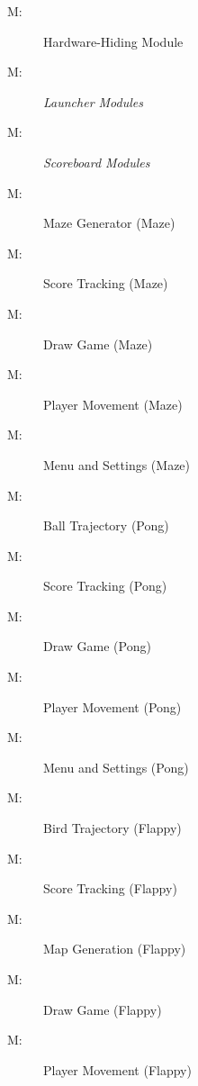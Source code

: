 \documentclass[12pt, titlepage]{article}
\newcounter{mnum}
\newcommand{\mthemnum}{M\themnum}
\begin{document}
\begin{description}
\item [ \mthemnum \label{mHH}:] Hardware-Hiding Module
\item [ \mthemnum \label{mLM}:] \textit{Launcher Modules}
\item [ \mthemnum \label{mSM}:] \textit{Scoreboard Modules}
\item [ \mthemnum \label{mMGM}:] Maze Generator (Maze)
\item [ \mthemnum \label{mSTM}:] Score Tracking (Maze)
\item [ \mthemnum \label{mDGM}:] Draw Game (Maze) 
\item [ \mthemnum \label{mPMM}:] Player Movement (Maze)
\item [ \mthemnum \label{mMSM}:] Menu and Settings (Maze) 
\item [ \mthemnum \label{mBTP}:] Ball Trajectory (Pong)
\item [ \mthemnum \label{mSTP}:] Score Tracking (Pong) 
\item [ \mthemnum \label{mDGP}:] Draw Game (Pong)
\item [ \mthemnum \label{mPMP}:] Player Movement (Pong)
\item [ \mthemnum \label{mMSP}:] Menu and Settings (Pong)
\item [ \mthemnum \label{mBDF}:] Bird Trajectory (Flappy)
\item [ \mthemnum \label{mSTF}:] Score Tracking (Flappy)
\item [ \mthemnum \label{mMGF}:] Map Generation (Flappy)
\item [ \mthemnum \label{mDGF}:] Draw Game (Flappy)
\item [ \mthemnum \label{mPMF}:] Player Movement (Flappy)

\end{description}

\newpage
\end{document}
